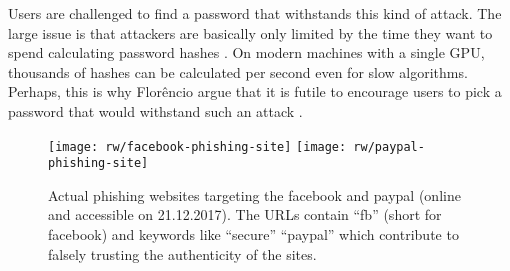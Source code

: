 Users are challenged to find a password that withstands this kind of attack. The large issue is that attackers are basically only limited by the time they want to spend calculating password hashes \cite{Block2017EconomicsOfflineCracking}. On modern machines with a single GPU, thousands of hashes can be calculated per second even for slow algorithms. Perhaps, this is why Florêncio \etal argue that it is futile to encourage users to pick a password that would withstand such an attack \cite{Florencio2014AdministratorsGuide, Florencio2016CommACM}. 

\begin{figure}[h!]
	\centering
	\texttt{[image: rw/facebook-phishing-site]}
	\texttt{[image: rw/paypal-phishing-site]}
	\caption{\label{fig:rw:phishingsite} Actual phishing websites targeting the facebook and paypal (online and accessible on 21.12.2017). The URLs contain ``fb'' (short for facebook) and keywords like ``secure'' ``paypal'' which contribute to falsely trusting the authenticity of the sites.}
\end{figure}

